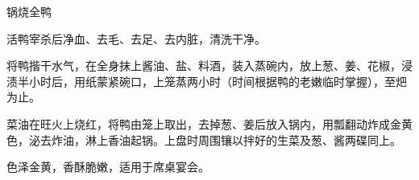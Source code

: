 \begin{recipe}{锅烧全鸭}

\ingredients


\preparation

\step 活鸭宰杀后净血、去毛、去足、去内脏，清洗干净。

\step 将鸭揩干水气，在全身抹上酱油、盐、料酒，装入蒸碗内，放上葱、姜、花椒，浸
渍半小时后，用纸蒙紧碗口，上笼蒸两小时（时间根据鸭的老嫩临时掌握），至𤆵为止。

\step 菜油在旺火上烧红，将鸭由笼上取出，去掉葱、姜后放入锅内，用瓢翻动炸成金黄
色，泌去炸油，淋上香油起锅。上盘时周围镶以拌好的生菜及葱、酱两碟同上。

\features

色泽金黄，香酥脆嫩，适用于席桌宴会。

\end{recipe}

